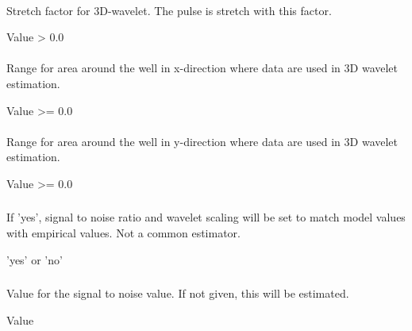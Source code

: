 \paragraph{}
 \slist
   \item \Description Stretch factor for 3D-wavelet. The pulse is stretch with this factor.
   \item \Argument Value > 0.0
   \item {}
\elist

\paragraph{}
 \slist
   \item \Description Range for area around the well in x-direction where data are used in 3D wavelet estimation.
   \item \Argument Value >= 0.0
   \item {}
\elist

\paragraph{}
 \slist
   \item \Description Range for area around the well in y-direction where data are used in 3D wavelet estimation.
   \item \Argument Value >= 0.0
   \item {}
\elist

\subsubsection{}
 \slist
   \item \Description If 'yes', signal to noise ratio and wavelet scaling will be set to match model values with empirical values. Not a common estimator.
   \item \Argument 'yes' or 'no'
   \item \Default
 \elist

\subsubsection{}
 \slist
   \item \Description Value for the signal to noise value. If not given, this will be estimated.
   \item \Argument Value
   \item \Default
 \elist

